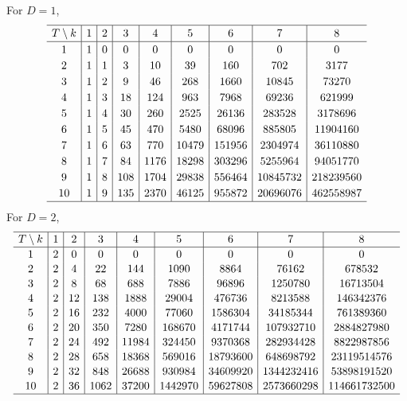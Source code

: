 \documentclass[10pt,a4paper]{amsart}
\numberwithin{equation}{section}
\begin{document}
For $D=1$,
\begin{gather*}
\setlength{\tabcolsep}{4.5pt}
\renewcommand{\arraystretch}{1.2}
\begin{tabular}{c|c|c|c|c|c|c|c|c}
\hline $T\setminus k$&1&2&3&4&5&6&7&8\\ \hline
1&1& 0& 0& 0& 0& 0& 0& 0\\
2&1& 1& 3& 10& 39& 160& 702& 3177\\
3&1& 2& 9& 46& 268& 1660& 10845& 73270\\
4&1& 3& 18& 124& 963& 7968& 69236& 621999\\
5&1& 4& 30& 260& 2525& 26136& 283528& 3178696\\
6&1& 5& 45& 470& 5480& 68096& 885805& 11904160\\
7&1& 6& 63& 770& 10479& 151956& 2304974& 36110880\\
8&1& 7& 84& 1176& 18298& 303296& 5255964& 94051770\\
9&1& 8& 108& 1704& 29838& 556464& 10845732& 218239560\\
10&1& 9& 135& 2370& 46125& 955872& 20696076& 462558987\\
\hline
\end{tabular}
\end{gather*}
For $D=2$,
\begin{gather*}
\setlength{\tabcolsep}{4.5pt}
\renewcommand{\arraystretch}{1.1}
\begin{tabular}{c|c|c|c|c|c|c|c|c}
\hline$T\setminus k$&1&2&3&4&5&6&7&8\\ \hline
1&2& 0& 0& 0& 0& 0& 0& 0\\
2&2& 4& 22& 144& 1090& 8864& 76162& 678532\\
3&2& 8& 68& 688& 7886& 96896& 1250780& 16713504\\
4&2& 12& 138& 1888& 29004& 476736& 8213588& 146342376\\
5&2& 16& 232& 4000& 77060& 1586304& 34185344& 761389360\\
6&2& 20& 350& 7280& 168670& 4171744& 107932710& 2884827980\\
7&2& 24& 492& 11984& 324450& 9370368& 282934428& 8822987856\\
8&2& 28& 658& 18368& 569016& 18793600& 648698792& 23119514576\\
9&2& 32& 848& 26688& 930984& 34609920& 1344232416& 53898191520\\
10&2& 36& 1062& 37200& 1442970& 59627808& 2573660298& 114661732500\\
\hline
\end{tabular}
\end{gather*}
\end{document}
